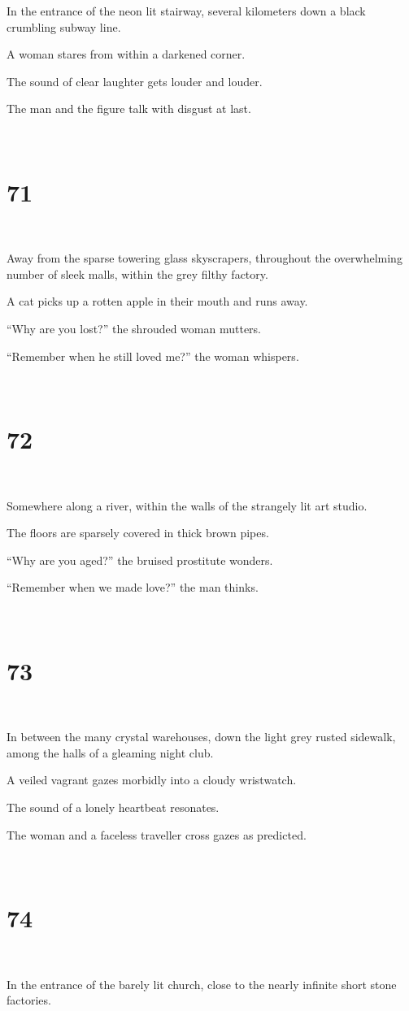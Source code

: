 \documentclass{report}
\begin{document}
In the entrance of the neon lit stairway, several kilometers down a black crumbling subway line.

A woman stares from within a darkened corner.

The sound of clear laughter gets louder and louder.

The man and the figure talk with disgust at last.

~
\chapter*{71}
~

Away from the sparse towering glass skyscrapers, throughout the overwhelming number of sleek malls, within the grey filthy factory.

A cat picks up a rotten apple in their mouth and runs away.

``Why are you lost?'' the shrouded woman mutters.

``Remember when he still loved me?'' the woman whispers.

~
\chapter*{72}
~

Somewhere along a river, within the walls of the strangely lit art studio.

The floors are sparsely covered in thick brown pipes.

``Why are you aged?'' the bruised prostitute wonders.

``Remember when we made love?'' the man thinks.

~
\chapter*{73}
~

In between the many crystal warehouses, down the light grey rusted sidewalk, among the halls of a gleaming night club.

A veiled vagrant gazes morbidly into a cloudy wristwatch.

The sound of a lonely heartbeat resonates.

The woman and a faceless traveller cross gazes as predicted.

~
\chapter*{74}
~

In the entrance of the barely lit church, close to the nearly infinite short stone factories.
\end{document}
